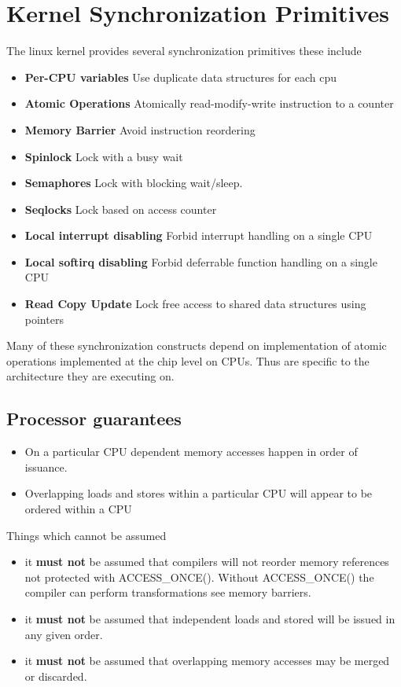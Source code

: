 \documentclass{article}
\begin{document}
\section{Kernel Synchronization Primitives}

The linux kernel provides several synchronization primitives these
include

\begin{itemize}
\item \textbf{Per-CPU variables}
  Use duplicate data structures for each cpu
\item \textbf{Atomic Operations}
  Atomically read-modify-write instruction to a counter
\item \textbf{Memory Barrier}
  Avoid instruction reordering
\item  \textbf{Spinlock}
  Lock with a busy wait
\item \textbf{Semaphores}
  Lock with blocking wait/sleep.
\item \textbf{Seqlocks}
  Lock based on access counter
\item \textbf{Local interrupt disabling}
  Forbid interrupt handling on a single CPU
\item \textbf{Local softirq disabling}
  Forbid deferrable function handling on a single CPU
\item \textbf{Read Copy Update}
  Lock free access to shared data structures using pointers
\end{itemize}

Many of these synchronization constructs depend on implementation of
atomic operations implemented at the chip level on CPUs. Thus are
specific to the architecture they are executing on.

\subsection{Processor guarantees}

\begin{itemize}
  \item On a particular CPU dependent memory accesses happen in order
    of issuance.

  \item Overlapping loads and stores within a particular CPU will
    appear to be ordered within a CPU
    
\end{itemize}

Things which cannot be assumed

\begin{itemize}
\item it \textbf{must not} be assumed that compilers will not reorder
  memory references not protected with ACCESS\_ONCE(). Without
  ACCESS\_ONCE() the compiler can perform transformations see memory
  barriers.
\item it \textbf{must not} be assumed that independent loads and
  stored will be issued in any given order.
\item it \textbf{must not} be assumed that overlapping memory accesses
  may be merged or discarded.  
\end{itemize}
\end{document}
